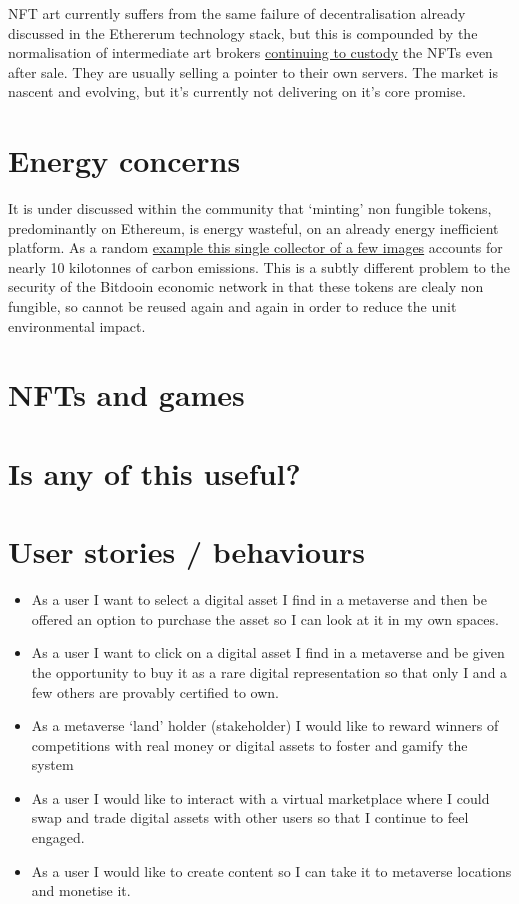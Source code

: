 NFT art currently suffers from the same failure of decentralisation already discussed in the Ethererum technology stack, but this is compounded by the normalisation of intermediate art brokers \href{https://moxie.org/2022/01/07/web3-first-impressions.html}{continuing to custody} the NFTs even after sale. They are usually selling a pointer to their own servers. The market is nascent and evolving, but it's currently not delivering on it's core promise.

\section{Energy concerns}
It is under discussed within the community that `minting' non fungible tokens, predominantly on Ethereum, is energy wasteful, on an already energy inefficient platform. As a random \href{https://carbon.fyi/?address=0x6Ec30Fd91A504Aad948839B985C7263888B2Ad68} {example this single collector of a few images} accounts for nearly 10 kilotonnes of carbon emissions. This is a subtly different problem to the security of the Bitdooin economic network in that these tokens are clealy non fungible, so cannot be reused again and again in order to reduce the unit environmental impact. 

\section{NFTs and games}

\section{Is any of this useful?}

\section{User stories / behaviours}
\label{behaviours}

\begin{itemize}
\item As a user I want to select a digital asset I find in a metaverse and then be offered an option to purchase the asset so I can look at it in my own spaces.
\item As a user I want to click on a digital asset I find in a metaverse and be given the opportunity to buy it as a rare digital representation so that only I and a few others are provably certified to own.
\item As a metaverse `land' holder (stakeholder) I would like to reward winners of competitions with real money or digital assets to foster and gamify the system
\item As a user I would like to interact with a virtual marketplace where I could swap and trade digital assets with other users so that I continue to feel engaged.
\item As a user I would like to create content so I can take it to metaverse locations and monetise it.
\end{itemize}

